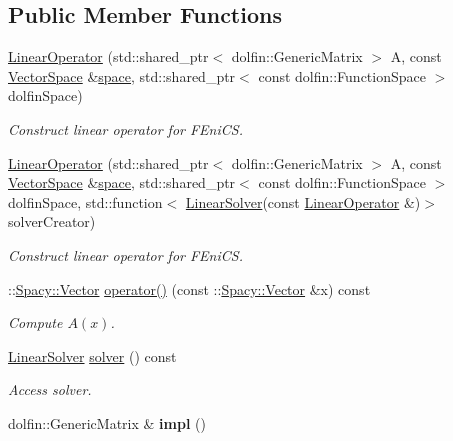 \subsection*{Public Member Functions}
\begin{DoxyCompactItemize}
\item 
\hyperlink{classSpacy_1_1FEniCS_1_1LinearOperator_a869923192af84816a4ea22f4fc3133cd_a869923192af84816a4ea22f4fc3133cd}{Linear\+Operator} (std\+::shared\+\_\+ptr$<$ dolfin\+::\+Generic\+Matrix $>$ A, const \hyperlink{classSpacy_1_1VectorSpace}{Vector\+Space} \&\hyperlink{classSpacy_1_1VectorBase_a95e87ce98f5a7646055d4e87e6024044_a95e87ce98f5a7646055d4e87e6024044}{space}, std\+::shared\+\_\+ptr$<$ const dolfin\+::\+Function\+Space $>$ dolfin\+Space)
\begin{DoxyCompactList}\small\item\em Construct linear operator for F\+Eni\+C\+S. \end{DoxyCompactList}\item 
\hyperlink{classSpacy_1_1FEniCS_1_1LinearOperator_a50110d01836902fd8a5e66433b20d348_a50110d01836902fd8a5e66433b20d348}{Linear\+Operator} (std\+::shared\+\_\+ptr$<$ dolfin\+::\+Generic\+Matrix $>$ A, const \hyperlink{classSpacy_1_1VectorSpace}{Vector\+Space} \&\hyperlink{classSpacy_1_1VectorBase_a95e87ce98f5a7646055d4e87e6024044_a95e87ce98f5a7646055d4e87e6024044}{space}, std\+::shared\+\_\+ptr$<$ const dolfin\+::\+Function\+Space $>$ dolfin\+Space, std\+::function$<$ \hyperlink{namespaceSpacy_a7d5cd1c6fb9dd85aa345b536caf30bba_a7d5cd1c6fb9dd85aa345b536caf30bba}{Linear\+Solver}(const \hyperlink{classSpacy_1_1FEniCS_1_1LinearOperator}{Linear\+Operator} \&)$>$ solver\+Creator)
\begin{DoxyCompactList}\small\item\em Construct linear operator for F\+Eni\+C\+S. \end{DoxyCompactList}\item 
\+::\hyperlink{classSpacy_1_1Vector}{Spacy\+::\+Vector} \hyperlink{classSpacy_1_1FEniCS_1_1LinearOperator_af4c055f20d5019a6b6da0264b5d9db26_af4c055f20d5019a6b6da0264b5d9db26}{operator()} (const \+::\hyperlink{classSpacy_1_1Vector}{Spacy\+::\+Vector} \&x) const 
\begin{DoxyCompactList}\small\item\em Compute $A(x)$. \end{DoxyCompactList}\item 
\hyperlink{namespaceSpacy_a7d5cd1c6fb9dd85aa345b536caf30bba_a7d5cd1c6fb9dd85aa345b536caf30bba}{Linear\+Solver} \hyperlink{classSpacy_1_1FEniCS_1_1LinearOperator_aa5aacfc25bb0d710f56c2323753d451f_aa5aacfc25bb0d710f56c2323753d451f}{solver} () const 
\begin{DoxyCompactList}\small\item\em Access solver. \end{DoxyCompactList}\item 
\hypertarget{classSpacy_1_1FEniCS_1_1LinearOperator_ad9ab633e50e6ddc4df504ddc4b6bc331}{}dolfin\+::\+Generic\+Matrix \& {\bfseries impl} ()\label{classSpacy_1_1FEniCS_1_1LinearOperator_ad9ab633e50e6ddc4df504ddc4b6bc331}


\end{DoxyCompactItemize}
